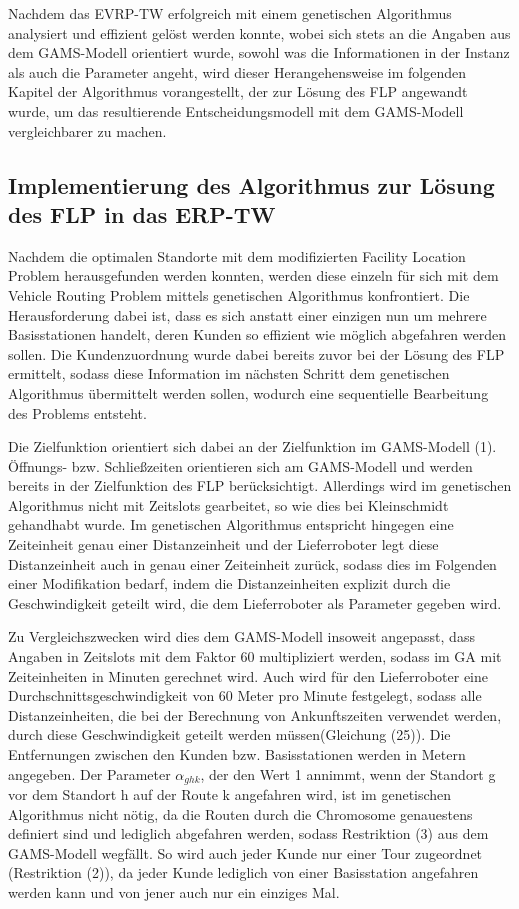 \documentclass[a4paper,12pt,parskip,bibtotoc,liststotoc]{article}
\begin{document}
Nachdem das EVRP-TW erfolgreich mit einem genetischen Algorithmus analysiert und effizient gelöst werden konnte, wobei sich stets an die Angaben aus dem GAMS-Modell orientiert wurde, sowohl was die Informationen in der Instanz als auch die Parameter angeht, wird dieser Herangehensweise im folgenden Kapitel der Algorithmus vorangestellt, der zur Lösung des FLP angewandt wurde, um das resultierende Entscheidungsmodell mit dem GAMS-Modell vergleichbarer zu machen.


\subsection{Implementierung des Algorithmus zur Lösung des FLP in das ERP-TW}


Nachdem die optimalen Standorte mit dem modifizierten Facility Location Problem herausgefunden werden konnten, werden diese einzeln für sich mit dem Vehicle Routing Problem mittels genetischen Algorithmus konfrontiert.
Die Herausforderung dabei ist, dass es sich anstatt einer einzigen nun um mehrere Basisstationen handelt, deren Kunden so effizient wie möglich abgefahren werden sollen.
Die Kundenzuordnung wurde dabei bereits zuvor bei der Lösung des FLP ermittelt, sodass diese Information im nächsten Schritt dem genetischen Algorithmus übermittelt werden sollen, wodurch eine sequentielle Bearbeitung des Problems entsteht.

Die Zielfunktion orientiert sich dabei an der Zielfunktion im GAMS-Modell (1).
Öffnungs- bzw. Schließzeiten orientieren sich am GAMS-Modell und werden bereits in der Zielfunktion des FLP berücksichtigt.
Allerdings wird im genetischen Algorithmus nicht mit Zeitslots gearbeitet, so wie dies bei Kleinschmidt gehandhabt wurde.
Im genetischen Algorithmus entspricht hingegen eine Zeiteinheit genau einer Distanzeinheit und der Lieferroboter legt diese Distanzeinheit auch in genau einer Zeiteinheit zurück, sodass dies im Folgenden einer Modifikation bedarf, indem die Distanzeinheiten explizit durch die Geschwindigkeit geteilt wird, die dem Lieferroboter als Parameter gegeben wird.

Zu Vergleichszwecken wird dies dem GAMS-Modell insoweit angepasst, dass Angaben in Zeitslots mit dem Faktor 60 multipliziert werden, sodass im GA mit Zeiteinheiten in Minuten gerechnet wird. 
Auch wird für den Lieferroboter eine Durchschnittsgeschwindigkeit von 60 Meter pro Minute festgelegt, sodass alle Distanzeinheiten, die bei der Berechnung von Ankunftszeiten verwendet werden, durch diese Geschwindigkeit geteilt werden müssen(Gleichung (25)).
Die Entfernungen zwischen den Kunden bzw. Basisstationen werden in Metern angegeben.
Der Parameter $\alpha_{ghk}$, der den Wert 1 annimmt, wenn der Standort g vor dem Standort h auf der Route k angefahren wird, ist im genetischen Algorithmus nicht nötig, da die Routen durch die Chromosome genauestens definiert sind und lediglich abgefahren werden, sodass Restriktion (3) aus dem GAMS-Modell wegfällt.
So wird auch jeder Kunde nur einer Tour zugeordnet (Restriktion (2)), da jeder Kunde lediglich von einer Basisstation angefahren werden kann und von jener auch nur ein einziges Mal.
\end{document}
